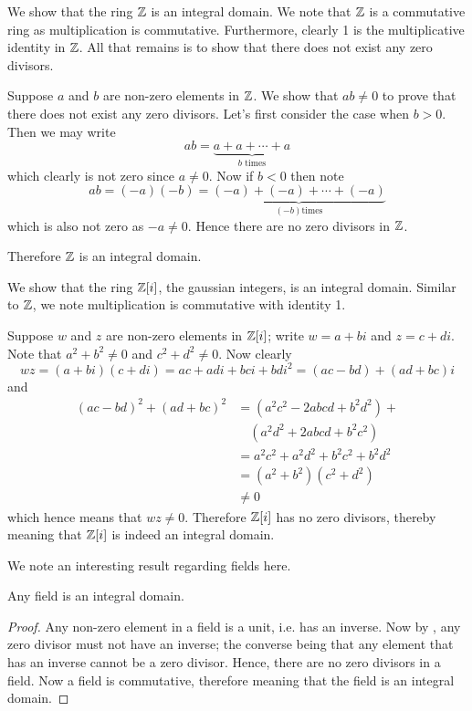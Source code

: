 \begin{example}
    We show that the ring $\mathbb{Z}$ is an integral domain. We note that $\mathbb{Z}$ is a commutative ring as multiplication is commutative. Furthermore, clearly 1 is the multiplicative identity in $\mathbb{Z}$. All that remains is to show that there does not exist any zero divisors.

    Suppose $a$ and $b$ are non-zero elements in $\mathbb{Z}$. We show that $ab \neq 0$ to prove that there does not exist any zero divisors. Let's first consider the case when $b > 0$. Then we may write
    \[
        ab = \underbrace{a + a + \cdots + a}_{b \text{ times}}
    \]
    which clearly is not zero since $a \neq 0$. Now if $b < 0$ then note
    \[
        ab = (-a)(-b) = \underbrace{(-a) + (-a) + \cdots + (-a)}_{(-b) \text{times}}
    \]
    which is also not zero as $-a \neq 0$. Hence there are no zero divisors in $\mathbb{Z}$.

    Therefore $\mathbb{Z}$ is an integral domain.
\end{example}
\begin{example}
    We show that the ring $\mathbb{Z}[i]$, the gaussian integers, is an integral domain. Similar to $\mathbb{Z}$, we note multiplication is commutative with identity 1.

    Suppose $w$ and $z$ are non-zero elements in $\mathbb{Z}[i]$; write $w = a+bi$ and $z = c+di$. Note that $a^2+b^2 \neq 0$ and $c^2 + d^2 \neq 0$. Now clearly
    \[
        wz = (a+bi)(c+di) = ac+adi+bci+bdi^2 = (ac-bd) + (ad+bc)i
    \]
    and
    \begin{align*}
        (ac-bd)^2 + (ad+bc)^2 &= (a^2c^2 - 2abcd + b^2d^2) +\\
        &\quad(a^2d^2 + 2abcd + b^2c^2)\\
        &= a^2c^2 + a^2d^2 + b^2c^2 + b^2d^2\\
        &= (a^2 + b^2)(c^2 + d^2)\\
        &\neq 0
    \end{align*}
    which hence means that $wz \neq 0$. Therefore $\mathbb{Z}[i]$ has no zero divisors, thereby meaning that $\mathbb{Z}[i]$ is indeed an integral domain.
\end{example}

We note an interesting result regarding fields here.
\begin{proposition}
    Any field is an integral domain.
\end{proposition}
\begin{proof}
    Any non-zero element in a field is a unit, i.e. has an inverse. Now by , any zero divisor must not have an inverse; the converse being that any element that has an inverse cannot be a zero divisor. Hence, there are no zero divisors in a field. Now a field is commutative, therefore meaning that the field is an integral domain.
\end{proof}

